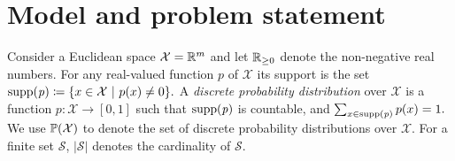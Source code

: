 \documentclass[11pt]{article}
\theoremstyle{definition}
\newcommand{\sayan}[1]{\textcolor{blue}{#1}}
\newcommand{\num}[1]{\relax\ifmmode \mathbb #1\else $\mathbb #1$\fi}
\newcommand{\nnnum}[1]{\relax\ifmmode
  {\mathbb #1}_{\geq 0} \else ${\mathbb #1}_{\geq 0}$
  \fi}
\newcommand{\reals}{{\num R}}                    %
\newcommand{\nnreals}{{\nnnum R}}                    %
\newcommand{\X}{\mathcal{X}}
\newcommand{\B}{\mathcal{B}}
\newcommand{\Prob}{{\num P}}
\newcommand{\supp}[1]{{\rm{supp}\mathit{(#1)}}}
\begin{document}
%
\section{Model and problem statement}
\label{sec:prelims}

Consider a Euclidean space $\X = \reals^m$ and let $\nnreals$ denote the non-negative real numbers.
For any real-valued function $p$ of $\X$ its support is the set $\supp{p} \coloneqq \{ x\in\X \ | \ p(x) \neq 0\}.$
%
%
A {\em discrete probability distribution\/} over $\X$ is a function $p:\X \rightarrow[0,1]$ such that  $\supp{p}$ is countable, and $\sum_{x \in \supp{p}}p(x) =1.$
%
We use $\Prob(\X)$ to denote the set of discrete probability distributions over $\X$.
%
For a finite set $\mathcal{S}$, $|\mathcal{S}|$ denotes the cardinality of $\mathcal{S}$.

\end{document}

